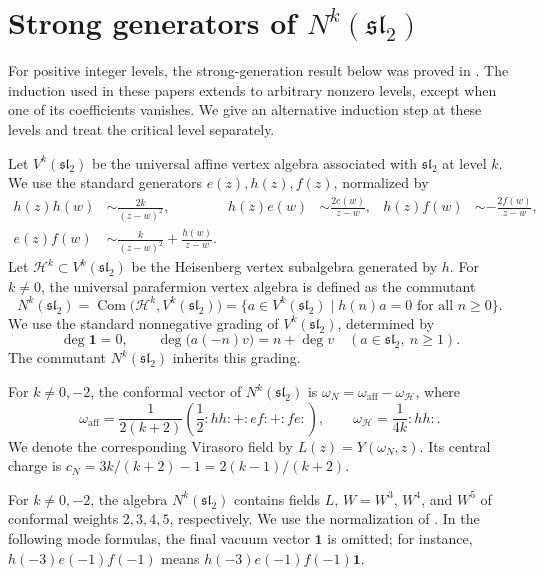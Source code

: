 \documentclass[11 pt]{amsart}
\theoremstyle{definition}
\theoremstyle{plain}
\begin{document}
\section{Strong generators of $N^k(\mathfrak{sl}_2)$}
\label{sec:strong-generators}

For positive integer levels, the strong-generation result below was proved
in \cite{DLY,DLWY,DW1}.  The induction used in these papers extends to arbitrary
nonzero levels, except when one of its coefficients vanishes.  We give an
alternative induction step at these levels and treat the critical level
separately.

Let $V^k(\mathfrak{sl}_2)$ be the universal affine vertex algebra associated
with $\mathfrak{sl}_2$ at level $k$.  We use the standard generators
$e(z),h(z),f(z)$, normalized by
\[
\begin{aligned}
h(z)h(w)&\sim \frac{2k}{(z-w)^2},
& h(z)e(w)&\sim \frac{2e(w)}{z-w},
& h(z)f(w)&\sim -\frac{2f(w)}{z-w},\\
e(z)f(w)&\sim \frac{k}{(z-w)^2}+\frac{h(w)}{z-w}.
\end{aligned}
\]
Let $\mathcal H^k\subset V^k(\mathfrak{sl}_2)$ be the Heisenberg vertex
subalgebra generated by $h$.  For $k\neq 0$, the universal parafermion vertex
algebra is defined as the commutant
\[
N^k(\mathfrak{sl}_2)=\operatorname{Com}\bigl(\mathcal H^k,V^k(\mathfrak{sl}_2)\bigr)
=\{a\in V^k(\mathfrak{sl}_2)\mid h(n)a=0\text{ for all }n\geq 0\}.
\]
We use the standard nonnegative grading of
$V^k(\mathfrak{sl}_2)$, determined by
\[
  \deg\mathbf1=0,\qquad
  \deg\bigl(a(-n)v\bigr)=n+\deg v
  \quad
  (a\in\mathfrak{sl}_2,\ n\geq1).
\]
The commutant $N^k(\mathfrak{sl}_2)$ inherits this grading.


For $k\neq0,-2$, the conformal vector of $N^k(\mathfrak{sl}_2)$ is
$\omega_N=\omega_{\mathrm{aff}}-\omega_{\mathcal H}$, where
\[
\omega_{\mathrm{aff}}
=\frac{1}{2(k+2)}\left(\frac{1}{2}:hh:+:ef:+:fe:\right),
\qquad
\omega_{\mathcal H}=\frac{1}{4k}:hh:.
\]
We denote the corresponding Virasoro field by
$L(z)=Y(\omega_N,z)$. Its central charge is
$c_N=3k/(k+2)-1=2(k-1)/(k+2)$.

For $k\neq0,-2$, the algebra $N^k(\mathfrak{sl}_2)$ contains fields
$L$, $W=W^3$, $W^4$, and $W^5$ of conformal weights $2,3,4,5$,
respectively.  We use the normalization of
\cite{DLY}.  In the following mode formulas, the final vacuum vector
$\mathbf 1$ is omitted; for instance,
$h(-3)e(-1)f(-1)$ means $h(-3)e(-1)f(-1)\mathbf 1$.
\end{document}
